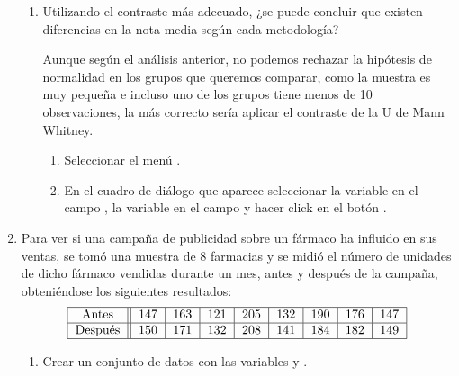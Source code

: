 \begin{enumerate}[leftmargin=*]
\begin{enumerate}
\item Utilizando el contraste más adecuado, ¿se puede concluir que existen diferencias en la nota media según cada
metodología?
\begin{indicacion}
Aunque según el análisis anterior, no podemos rechazar la hipótesis de normalidad en los grupos que queremos comparar,
como la muestra es muy pequeña e incluso uno de los grupos tiene menos de 10 observaciones, la más correcto sería
aplicar el contraste de la U de Mann Whitney.
\begin{enumerate}
\item Seleccionar el menú .
\item En el cuadro de diálogo que aparece seleccionar la variable  en el campo , la variable
 en el campo  y hacer click en el botón .
\end{enumerate}
\end{indicacion}
\end{enumerate}

\item  Para ver si una campaña de publicidad sobre un fármaco ha influido en sus ventas, se tomó una muestra de 8
farmacias y se midió el número de unidades de dicho fármaco vendidas durante un mes, antes y después de la campaña,
obteniéndose los siguientes resultados:
\[
\begin{tabular}{|c||c|c|c|c|c|c|c|c|}
\hline Antes & 147 & 163 & 121 & 205 & 132 & 190 & 176 & 147 \\
\hline Después & 150 & 171 & 132 & 208 & 141 & 184 & 182 & 149
\\ \hline
\end{tabular}
\]
\begin{enumerate}
\item Crear un conjunto de datos  con las variables  y .


\end{enumerate}
\end{enumerate}
